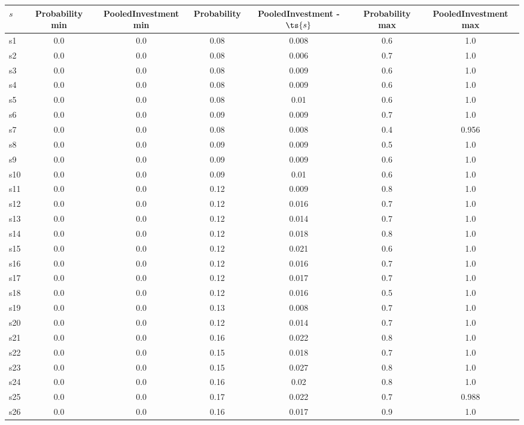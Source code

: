 \documentclass{article}
\begin{document}
\noindent\begin{tabular}{|l|c|c|c|c|c|c|}
\hline
$s$& Probability min & PooledInvestment min & Probability & PooledInvestment - $\ts{s}$ & Probability max & PooledInvestment max\\
\hline
s1 &0.0 & 0.0 & 0.08 & 0.008 & 0.6 & 1.0\\
\hline
s2 &0.0 & 0.0 & 0.08 & 0.006 & 0.7 & 1.0\\
\hline
s3 &0.0 & 0.0 & 0.08 & 0.009 & 0.6 & 1.0\\
\hline
s4 &0.0 & 0.0 & 0.08 & 0.009 & 0.6 & 1.0\\
\hline
s5 &0.0 & 0.0 & 0.08 & 0.01 & 0.6 & 1.0\\
\hline
s6 &0.0 & 0.0 & 0.09 & 0.009 & 0.7 & 1.0\\
\hline
s7 &0.0 & 0.0 & 0.08 & 0.008 & 0.4 & 0.956\\
\hline
s8 &0.0 & 0.0 & 0.09 & 0.009 & 0.5 & 1.0\\
\hline
s9 &0.0 & 0.0 & 0.09 & 0.009 & 0.6 & 1.0\\
\hline
s10 &0.0 & 0.0 & 0.09 & 0.01 & 0.6 & 1.0\\
\hline
s11 &0.0 & 0.0 & 0.12 & 0.009 & 0.8 & 1.0\\
\hline
s12 &0.0 & 0.0 & 0.12 & 0.016 & 0.7 & 1.0\\
\hline
s13 &0.0 & 0.0 & 0.12 & 0.014 & 0.7 & 1.0\\
\hline
s14 &0.0 & 0.0 & 0.12 & 0.018 & 0.8 & 1.0\\
\hline
s15 &0.0 & 0.0 & 0.12 & 0.021 & 0.6 & 1.0\\
\hline
s16 &0.0 & 0.0 & 0.12 & 0.016 & 0.7 & 1.0\\
\hline
s17 &0.0 & 0.0 & 0.12 & 0.017 & 0.7 & 1.0\\
\hline
s18 &0.0 & 0.0 & 0.12 & 0.016 & 0.5 & 1.0\\
\hline
s19 &0.0 & 0.0 & 0.13 & 0.008 & 0.7 & 1.0\\
\hline
s20 &0.0 & 0.0 & 0.12 & 0.014 & 0.7 & 1.0\\
\hline
s21 &0.0 & 0.0 & 0.16 & 0.022 & 0.8 & 1.0\\
\hline
s22 &0.0 & 0.0 & 0.15 & 0.018 & 0.7 & 1.0\\
\hline
s23 &0.0 & 0.0 & 0.15 & 0.027 & 0.8 & 1.0\\
\hline
s24 &0.0 & 0.0 & 0.16 & 0.02 & 0.8 & 1.0\\
\hline
s25 &0.0 & 0.0 & 0.17 & 0.022 & 0.7 & 0.988\\
\hline
s26 &0.0 & 0.0 & 0.16 & 0.017 & 0.9 & 1.0\\

\end{tabular}
\end{document}
